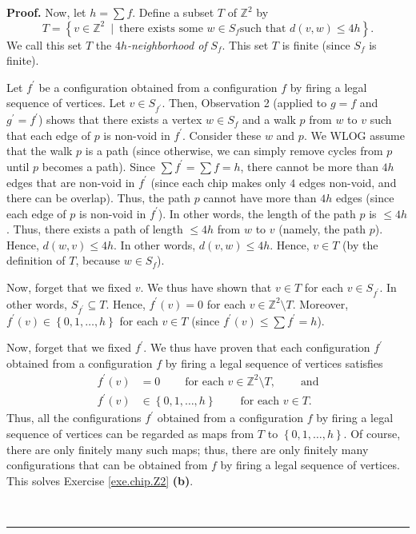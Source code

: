 \documentclass[numbers=enddot,12pt,final,onecolumn,notitlepage]{scrartcl}%
\theoremstyle{definition}
\newenvironment{proof}[1][Proof]{\noindent\textbf{#1.} }{\ \rule{0.5em}{0.5em}}
\let\sumnonlimits\sum
\renewcommand{\sum}{\sumnonlimits\limits}
\newcommand{\tup}[1]{\left( #1 \right)}
\begin{document}
\begin{proof}
Now, let $h=\sum f$. Define a subset $T$ of $\mathbb{Z}^{2}$ by%
\[
T=\left\{  v\in\mathbb{Z}^{2}\ \mid\ \text{there exists some }w\in S_{f}\text{
such that }d\left(  v,w\right)  \leq4h\right\}  .
\]
We call this set $T$ the $4h$\textit{-neighborhood of }$S_{f}$. This set $T$
is finite (since $S_{f}$ is finite).

Let $f^{\prime}$ be a configuration obtained from a configuration $f$ by
firing a legal sequence of vertices. Let $v\in S_{f^{\prime}}$. Then,
Observation 2 (applied to $g=f$ and $g^{\prime}=f^{\prime}$) shows that there
exists a vertex $w\in S_{f}$ and a walk $p$ from $w$ to $v$ such that each
edge of $p$ is non-void in $f^{\prime}$. Consider these $w$ and $p$. We WLOG
assume that the walk $p$ is a path (since otherwise, we can simply remove
cycles from $p$ until $p$ becomes a path). Since $\sum f^{\prime}=\sum f=h$,
there cannot be more than $4h$ edges that are non-void in $f^{\prime}$ (since
each chip makes only $4$ edges non-void, and there can be overlap). Thus, the
path $p$ cannot have more than $4h$ edges (since each edge of $p$ is non-void
in $f^{\prime}$). In other words, the length of the path $p$ is $\leq4h$.
Thus, there exists a path of length $\leq4h$ from $w$ to $v$ (namely, the path
$p$). Hence, $d\left(  w,v\right)  \leq4h$. In other words,
$d \tup{v, w} \leq 4h$.
Hence, $v\in T$ (by the definition of $T$, because $w\in S_{f}$).

Now, forget that we fixed $v$. We thus have shown that $v\in T$ for each $v\in
S_{f^{\prime}}$. In other words, $S_{f^{\prime}}\subseteq T$. Hence,
$f^{\prime}\left(  v\right)  =0$ for each $v\in\mathbb{Z}^{2}\setminus T$.
Moreover, $f^{\prime}\left(  v\right)  \in\left\{  0,1,\ldots,h\right\}  $ for
each $v\in T$ (since $f^{\prime}\left(  v\right)  \leq\sum f^{\prime}=h$).

Now, forget that we fixed $f^{\prime}$. We thus have proven that each
configuration $f^{\prime}$ obtained from a configuration $f$ by firing a legal
sequence of vertices satisfies%
\begin{align*}
f^{\prime}\left(  v\right)   &  =0\ \ \ \ \ \ \ \ \ \ \text{for each }%
v\in\mathbb{Z}^{2}\setminus T,\ \ \ \ \ \ \ \ \ \ \text{and}\\
f^{\prime}\left(  v\right)   &  \in\left\{  0,1,\ldots,h\right\}
\ \ \ \ \ \ \ \ \ \ \text{for each }v\in T.
\end{align*}
Thus, all the configurations $f^{\prime}$ obtained from a configuration $f$ by
firing a legal sequence of vertices can be regarded as maps from $T$ to
$\left\{  0,1,\ldots,h\right\}  $. Of course, there are only finitely many
such maps; thus, there are only finitely many configurations that can be
obtained from $f$ by firing a legal sequence of vertices. This solves Exercise
\ref{exe.chip.Z2} \textbf{(b)}.


\end{proof}
\end{document}
